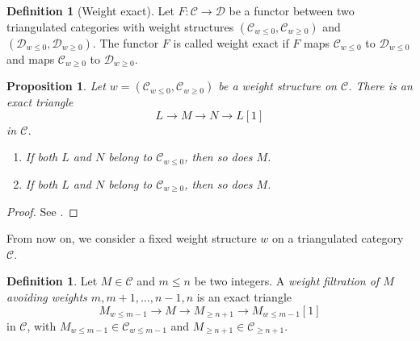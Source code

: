 \documentclass[11pt, a4paper]{amsart}
\theoremstyle{plain}
\newtheorem{proposition}[theorem]{Proposition}
\theoremstyle{definition}
\newtheorem{definition}[theorem]{Definition}
\numberwithin{equation}{section}
\begin{document}
\begin{definition}[Weight exact] \cite[Definition 4.4.4]{Bondarko10}
    Let $F \colon \mathcal{C} \rightarrow \mathcal{D}$ be a functor between two triangulated categories with weight structures $(\mathcal{C}_{w \le 0}, \mathcal{C}_{w \ge 0})$ and $(\mathcal{D}_{w \le 0}, \mathcal{D}_{w \ge 0})$. The functor $F$ is called weight exact if $F$ maps $\mathcal{C}_{w \le 0}$
    to $\mathcal{D}_{w \le 0}$ and maps $\mathcal{C}_{w \ge 0}$ to $\mathcal{D}_{w \ge 0}$. 
\end{definition}

\begin{proposition}
    Let $w = (\mathcal{C}_{w \le 0}, \mathcal{C}_{w \ge 0})$ be a weight structure on $\mathcal{C}$. There is an exact triangle 
    \begin{equation*}
        L \rightarrow M \rightarrow N \rightarrow L[1]
    \end{equation*}
    in $\mathcal{C}$.
    \begin{enumerate}
        \item If both $L$ and $N$ belong to $\mathcal{C}_{w \le 0}$, then so does $M$. 
        \item If both $L$ and $N$ belong to $\mathcal{C}_{w \ge 0}$, then so does $M$. 
    \end{enumerate}
\end{proposition}
\begin{proof}
    See \cite[Proposition 1.3.3.3]{Bondarko10}. 
\end{proof}

From now on, we consider a fixed weight structure $w$ on a triangulated category $\mathcal{C}$. 
\begin{definition}
    Let $M \in \mathcal{C}$ and $m \le n$ be two integers. A \textit{weight filtration of $M$ avoiding weights $m, m + 1, \ldots, n - 1, n$} is an 
    exact triangle 
    \begin{equation*}
        M_{w \le m - 1} \rightarrow M \rightarrow M_{\ge n + 1} \rightarrow M_{w \le m - 1}[1]
    \end{equation*}
    in $\mathcal{C}$,  with $M_{w \le m - 1} \in \mathcal{C}_{w \le m - 1}$ and $M_{\ge n + 1} \in \mathcal{C}_{\ge n + 1}$. 
\end{definition}
\end{document}
